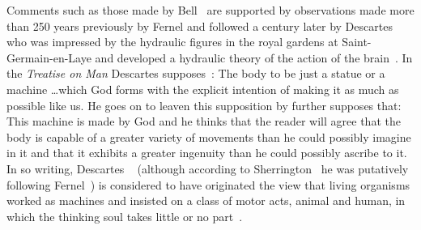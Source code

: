 \documentclass[10pt,letterpaper]{article}
\begin{document}
Comments such as those made by Bell~\cite{bell11} are supported by observations made more than 250 years previously by Fernel and followed a century later by Descartes who was impressed by the hydraulic figures in the royal gardens at Saint-Germain-en-Laye and developed a hydraulic theory of the action of the brain~\cite{cobb60}. In the {\it{Treatise on Man}} Descartes supposes~\cite{descartes04a}: The body to be just a statue or a machine \ldots which God forms with the explicit intention of making it as much as possible like us. He goes on to leaven this supposition by further supposes that: This machine is made by God and he thinks that the reader will agree that the body is capable of a greater variety of movements than he could possibly imagine in it and that it exhibits a greater ingenuity than he could possibly ascribe to it. In so writing, Descartes ~\cite{descartes04a} (although according to Sherrington~\cite{sherrington53} he was putatively following Fernel~\cite{fernel67}) is considered to have originated the view that living organisms worked as machines and insisted on a class of motor acts, animal and human, in which the thinking soul takes little or no part~\cite{descartes62}.
\end{document}
